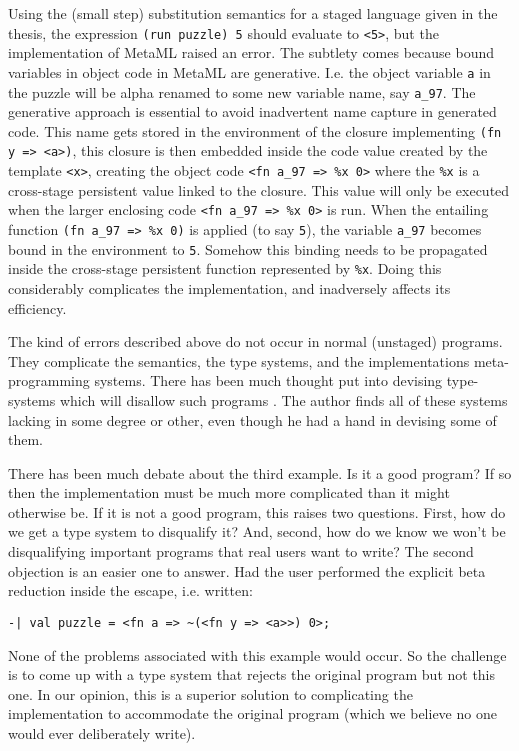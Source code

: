 \documentclass{sigplanconf}
\begin{document}
\begin{itemize}
Using the (small step) substitution semantics for a staged language given in
the thesis, the expression \verb+(run puzzle) 5+ should evaluate to 
\verb+<5>+, but the implementation of MetaML raised an error. The subtlety comes
because bound variables in object code in MetaML are generative. I.e. the
object variable {\tt a} in the puzzle will be alpha renamed to some new
variable name, say \verb+a_97+. The generative approach is essential to avoid
inadvertent name capture in generated code. This name gets stored in the
environment of the closure implementing \verb+(fn y => <a>)+, this closure is
then embedded inside the code value created by the template \verb+<x>+,
creating the object code \verb+<fn a_97 => %x 0>+ where the \verb+%x+ is a
cross-stage persistent value linked to the closure. This value will only be
executed when the larger enclosing code \verb+<fn a_97 => %x 0>+ is run. When
the entailing function \verb+(fn a_97 => %x 0)+ is applied (to say \verb+5+),
the variable \verb+a_97+ becomes bound in the environment to \verb+5+. Somehow
this binding needs to be propagated inside the cross-stage persistent function
represented by \verb+%x+. Doing this considerably complicates the
implementation, and inadversely affects its efficiency.

\end{itemize}

The kind of errors described above do not occur in normal (unstaged)
programs. They complicate the semantics, the type systems, and the
implementations meta-programming systems. There has been much thought put
into devising type-systems which will disallow such programs
\cite{Moggi-Taha-Benaissa-Sheard-ESOP99,Calgano-Moggi-Sheard-JFP03,T00,TahNie03}. 
The author finds all of these systems lacking in some degree or other, even
though he had a hand in devising some of them.

There has been much debate about the third example. Is it a good program?
If so then the implementation must be much more complicated than it might
otherwise be. If it is not a good program, this raises two questions.
First, how do we get a type system to disqualify it? And, second, how do
we know we won't be disqualifying important programs that real users want
to write? The second objection is an easier one to answer. Had the user
performed the explicit beta reduction inside the escape, i.e. written:

\begin{verbatim}
-| val puzzle = <fn a => ~(<fn y => <a>>) 0>;
\end{verbatim}
None of the problems associated with this example would occur. So the challenge
is to come up with a type system that rejects the original program
but not this one. In our opinion, this is a superior solution to complicating
the implementation to accommodate the original program (which we believe
no one would ever deliberately write). 
\end{document}
